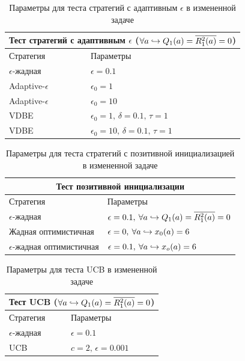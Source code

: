 \begin{table}
\centering
\renewcommand{\arraystretch}{1.3}
\begin{tabular}{ |m{3cm}|m{5cm}|  }
 \hline
 \multicolumn{2}{|c|}{Тест стратегий с адаптивным $\epsilon$ ($\forall a \hookrightarrow Q_1(a) = \overline{R_1^2(a)} = 0$)} \\
 \hline
 Стратегия & Параметры \\
 \hline
 $\epsilon$-жадная & $\epsilon = 0.1$ \\
 \hline
 Adaptive-$\epsilon$   &  $\epsilon_0 = 1$ \\
 \hline
 Adaptive-$\epsilon$ & $\epsilon_0 = 10$ \\
 \hline
 VDBE & $\epsilon_0 = 1, \, \delta = 0.1, \, \tau = 1$ \\
 \hline
 VDBE & $\epsilon_0 = 10, \, \delta = 0.1, \, \tau = 1$ \\
 \hline
\end{tabular}
\caption{Параметры для теста стратегий с адаптивным $\epsilon$ в измененной задаче}
\label{table:aversion_adaptive}
\end{table}

\begin{table}
\centering
\renewcommand{\arraystretch}{1.3}
\begin{tabular}{ |m{4cm}|m{5cm}|  }
 \hline
 \multicolumn{2}{|c|}{Тест позитивной инициализации} \\
 \hline
 Стратегия & Параметры \\
 \hline
 $\epsilon$-жадная & $\epsilon = 0.1, \: \forall a \hookrightarrow Q_1(a) = \overline{R_1^2(a)} = 0$ \\
 \hline
 Жадная оптимистичная & $\epsilon = 0, \: \forall a \hookrightarrow x_0(a) = 6$ \\
 \hline
 $\epsilon$-жадная оптимистичная & $\epsilon = 0.1, \: \forall a \hookrightarrow x_o(a) = 6$ \\
 \hline
\end{tabular}
\caption{Параметры для теста стратегий с позитивной инициализацией в измененной задаче}
\label{table:aversion_positive}
\end{table}

\begin{table}
\centering
\renewcommand{\arraystretch}{1.3}
\begin{tabular}{ |m{3cm}|m{4cm}|  }
 \hline
 \multicolumn{2}{|c|}{Тест UCB ($\forall a \hookrightarrow Q_1(a) = \overline{R_1^2(a)} = 0$)} \\
 \hline
 Стратегия & Параметры \\
 \hline
 $\epsilon$-жадная & $\epsilon = 0.1$ \\
 \hline
 UCB & $c=2, \, \epsilon=0.001$ \\
 \hline
\end{tabular}
\caption{Параметры для теста UCB в измененной задаче}
\label{table:aversion_ucb}
\end{table}



